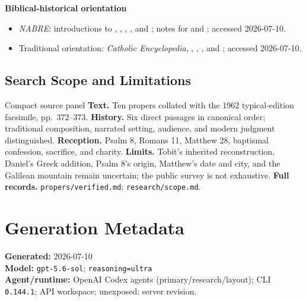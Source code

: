 \begin{deepstudy}
\textbf{Biblical-historical orientation}
{\footnotesize
\begin{itemize}[itemsep=0em,topsep=0.15em,parsep=0pt]
\item \emph{NABRE}: introductions to , , , , and ; notes for  and ; accessed 2026-07-10.
\item Traditional orientation: \emph{Catholic Encyclopedia}, , , , and ; accessed 2026-07-10.
\end{itemize}
}

\subsection*{Search Scope and Limitations}

\begin{studybox}{Compact source panel}
\textbf{Text.} Ten propers collated with the 1962 typical-edition facsimile, pp.~372--373. \textbf{History.} Six direct passages in canonical order; traditional composition, narrated setting, audience, and modern judgment distinguished. \textbf{Reception.} Psalm 8, Romans 11, Matthew 28, baptismal confession, sacrifice, and charity. \textbf{Limits.} Tobit's inherited reconstruction, Daniel's Greek addition, Psalm 8's origin, Matthew's date and city, and the Galilean mountain remain uncertain; the public survey is not exhaustive. \textbf{Full records.} \nolinkurl{propers/verified.md}; \nolinkurl{research/scope.md}.
\end{studybox}

\section*{Generation Metadata}

{\footnotesize
\textbf{Generated:} 2026-07-10\\
\textbf{Model:} \texttt{gpt-5.6-sol}; \texttt{reasoning=ultra}\\
\textbf{Agent/runtime:} OpenAI Codex agents (primary/research/layout); CLI \texttt{0.144.1}; API workspace; unexposed: server revision.\par
}

\end{deepstudy}

